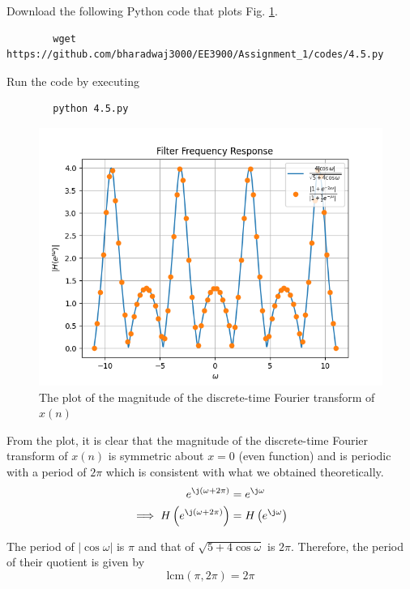 \documentclass[journal,12pt,twocolumn]{IEEEtran}
\providecommand{\brak}[1]{\ensuremath{\left(#1\right)}}
\providecommand{\abs}[1]{\left\vert#1\right\vert}
\numberwithin{equation}{section}
\renewcommand\thesection{\arabic{section}}
\begin{document}
\begin{enumerate}[label=\thesection.\arabic*]
	Download the following Python code that plots Fig. \ref{fig-4.5}.
	\begin{lstlisting}
		wget https://github.com/bharadwaj3000/EE3900/Assignment_1/codes/4.5.py
	\end{lstlisting}
	
	Run the code by executing
	\begin{lstlisting}
		python 4.5.py
	\end{lstlisting}

	\begin{figure}[!ht]
		\centering
		\includegraphics[width=\columnwidth]{./figs/4.5.png}
		\caption{The plot of the magnitude of the discrete-time Fourier transform of $x(n)$}
		\label{fig-4.5}	
	\end{figure}

	From the plot, it is clear that the magnitude of the discrete-time Fourier transform of $x(n)$ is symmetric about $x = 0$ (even function) and is periodic with a period of $2\pi$ which is consistent with what we obtained theoretically.
	\begin{align}
		e^{\j \brak{\omega + 2\pi}} &= e^{\j \omega} \\
		\implies H\brak{e^{\j \brak{\omega + 2\pi}}} &= H\brak{e^{\j \omega}}
	\end{align}	 
	
	The period of $\abs{\cos\omega}$ is $\pi$ and that of $\sqrt{5 + 4\cos\omega}$ is $2\pi$. Therefore, the period of their quotient is given by
	\begin{equation}
		\textrm{lcm}(\pi, 2\pi) = 2\pi
	\end{equation}
	

\end{enumerate}
\end{document}
